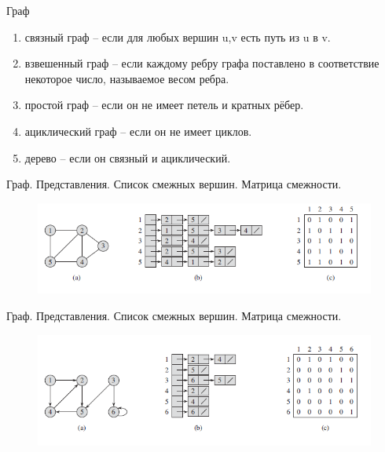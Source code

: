 \documentclass[10pt]{beamer}
\begin{document}
\begin{frame}{Граф}
\begin{enumerate}
\item связный граф -- если для любых вершин u,v есть путь из u в v.
\item взвешенный граф -- если каждому ребру графа поставлено в соответствие некоторое число, называемое весом ребра.
\item простой граф -- если он не имеет петель и кратных рёбер.
\item ациклический граф -- если он не имеет циклов.
\item дерево -- если он связный и ациклический.
\end{enumerate}
\end{frame}

\begin{frame}{Граф. Представления. Список смежных вершин. Матрица смежности.}
\begin{figure}
\centerline{\includegraphics[width=1.1\linewidth]{images/graphrep1.png}}
\end{figure}
\end{frame}

\begin{frame}{Граф. Представления. Список смежных вершин. Матрица смежности.}
\begin{figure}
\centerline{\includegraphics[width=1.1\linewidth]{images/graph_rep2.png}}
\end{figure}
\end{frame}
\end{document}
